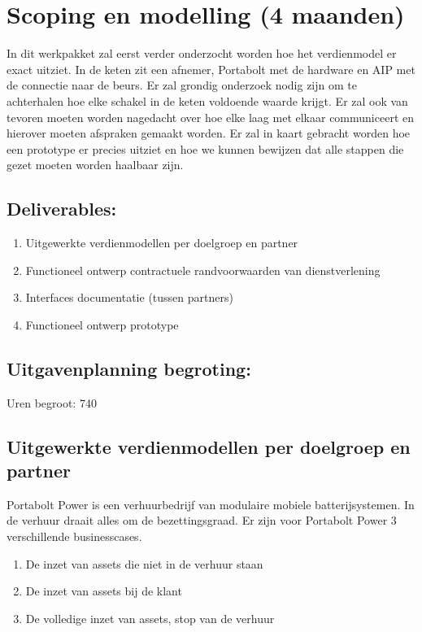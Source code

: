 \documentclass{article} %
\begin{document}
\section{Scoping en modelling (4 maanden)}

\indent In dit werkpakket zal eerst verder onderzocht worden hoe het verdienmodel er exact uitziet. In de keten zit een afnemer, Portabolt met de hardware en AIP met de connectie naar de beurs. Er zal grondig onderzoek nodig zijn om te achterhalen hoe elke schakel in de keten voldoende waarde krijgt. Er zal ook van tevoren moeten worden nagedacht over hoe elke laag met elkaar communiceert en hierover moeten afspraken gemaakt worden. Er zal in kaart gebracht worden hoe een prototype er precies uitziet en hoe we kunnen bewijzen dat alle stappen die gezet moeten worden haalbaar zijn.

\subsection*{Deliverables:}
\begin{enumerate}
    \item Uitgewerkte verdienmodellen per doelgroep en partner
    \item Functioneel ontwerp contractuele randvoorwaarden van dienstverlening
    \item Interfaces documentatie (tussen partners)
    \item Functioneel ontwerp prototype
\end{enumerate}

\subsection*{Uitgavenplanning begroting:}
\indent Uren begroot: 740

\subsection{Uitgewerkte verdienmodellen per doelgroep en partner}
\indent Portabolt Power is een verhuurbedrijf van modulaire mobiele batterijsystemen. In de verhuur draait alles om de bezettingsgraad. Er zijn voor Portabolt Power 3 verschillende businesscases.
\begin{enumerate}
    \item De inzet van assets die niet in de verhuur staan
    \item De inzet van assets bij de klant
    \item De volledige inzet van assets, stop van de verhuur
\end{enumerate}
\end{document}
